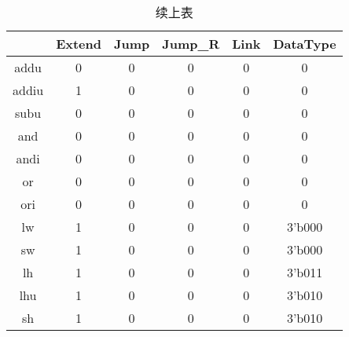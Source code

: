 \documentclass[UTF8]{ctexart}
\begin{document}
\begin{table}[H]
	\centering
	\begin{threeparttable}
		\caption{续上表}
		\begin{tabular}{|c|c|c|c|c|c|}
			\hline
			\rowcolor{mypink}
			\diagbox{\textbf{Inst}}{\textbf{Output}} & \textbf{Extend} & \textbf{Jump} & \textbf{Jump\_R} & \textbf{Link} & \textbf{DataType} \\
			\hline
			addu                                     & 0               & 0             & 0                & 0             & 0                 \\
			\hline
			addiu                                    & 1               & 0             & 0                & 0             & 0                 \\
			\hline
			subu                                     & 0               & 0             & 0                & 0             & 0                 \\
			\hline
			and                                      & 0               & 0             & 0                & 0             & 0                 \\
			\hline
			andi                                     & 0               & 0             & 0                & 0             & 0                 \\
			\hline
			or                                       & 0               & 0             & 0                & 0             & 0                 \\
			\hline
			ori                                      & 0               & 0             & 0                & 0             & 0                 \\
			\hline
			lw                                       & 1               & 0             & 0                & 0             & 3'b000            \\
			\hline
			sw                                       & 1               & 0             & 0                & 0             & 3'b000            \\
			\hline
			lh                                       & 1               & 0             & 0                & 0             & 3'b011            \\
			\hline
			lhu                                      & 1               & 0             & 0                & 0             & 3'b010            \\
			\hline
			sh                                       & 1               & 0             & 0                & 0             & 3'b010            \\

\end{tabular}
\end{threeparttable}
\end{table}
\end{document}
